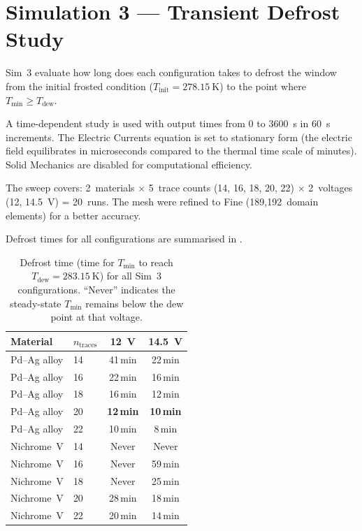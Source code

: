 \section{Simulation 3 --- Transient Defrost Study}
\label{sec:sim3}

Sim~3 evaluate how long does each configuration takes to defrost the window from the initial frosted condition ($T_\text{init} = \SI{278.15}{\kelvin}$) to the point where $T_\text{min} \geq T_\text{dew}$.

A time-dependent study is used with output times from 0 to \SI{3600}{\second} in \SI{60}{\second} increments. The Electric Currents equation is set to stationary form (the electric field equilibrates in microseconds compared to the thermal time scale of minutes). Solid Mechanics are disabled for computational efficiency.

The sweep covers: 2~materials $\times$ 5~trace counts (14, 16, 18, 20, 22) $\times$ 2~voltages (12, \SI{14.5}{\volt}) = 20~runs. The mesh were refined to Fine (189,192~domain elements) for a better accuracy.

Defrost times for all configurations are summarised in .

\begin{table}[H]
    \centering
    \caption{Defrost time (time for $T_\text{min}$ to reach $T_\text{dew} = \SI{283.15}{\kelvin}$) for all Sim~3 configurations. ``Never'' indicates the steady-state $T_\text{min}$ remains below the dew point at that voltage.}
    \label{tab:sim3-defrost}
    \begin{tabular}{@{}llcc@{}}
        \toprule
        \textbf{Material} & $n_\text{traces}$ & \SI{12}{\volt} & \SI{14.5}{\volt} \\
        \midrule
        Pd--Ag alloy & 14 & 41\,min & 22\,min \\
        Pd--Ag alloy & 16 & 22\,min & 16\,min \\
        Pd--Ag alloy & 18 & 16\,min & 12\,min \\
        Pd--Ag alloy & 20 & \textbf{12\,min} & \textbf{10\,min} \\
        Pd--Ag alloy & 22 & 10\,min &  8\,min \\
        \midrule
        Nichrome~V   & 14 & Never   & Never   \\
        Nichrome~V   & 16 & Never   & 59\,min \\
        Nichrome~V   & 18 & Never   & 25\,min \\
        Nichrome~V   & 20 & 28\,min & 18\,min \\
        Nichrome~V   & 22 & 20\,min & 14\,min \\
        \bottomrule
    \end{tabular}
\end{table}

